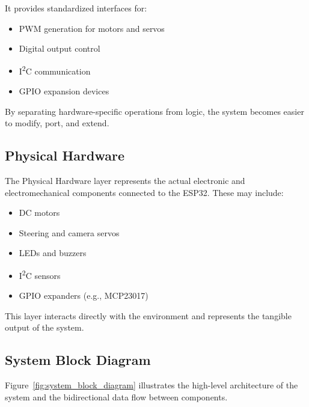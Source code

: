 It provides standardized interfaces for:

\begin{itemize}
	\item PWM generation for motors and servos
	\item Digital output control
	\item I\textsuperscript{2}C communication
	\item GPIO expansion devices
\end{itemize}

By separating hardware-specific operations from logic, the system becomes easier to modify, port, and extend.

\subsection{Physical Hardware}

The Physical Hardware layer represents the actual electronic and electromechanical components connected to the ESP32. These may include:

\begin{itemize}
	\item DC motors
	\item Steering and camera servos
	\item LEDs and buzzers
	\item I\textsuperscript{2}C sensors
	\item GPIO expanders (e.g., MCP23017)
\end{itemize}

This layer interacts directly with the environment and represents the tangible output of the system.

\subsection{System Block Diagram}

Figure~\ref{fig:system_block_diagram} illustrates the high-level architecture of the system and the bidirectional data flow between components.

